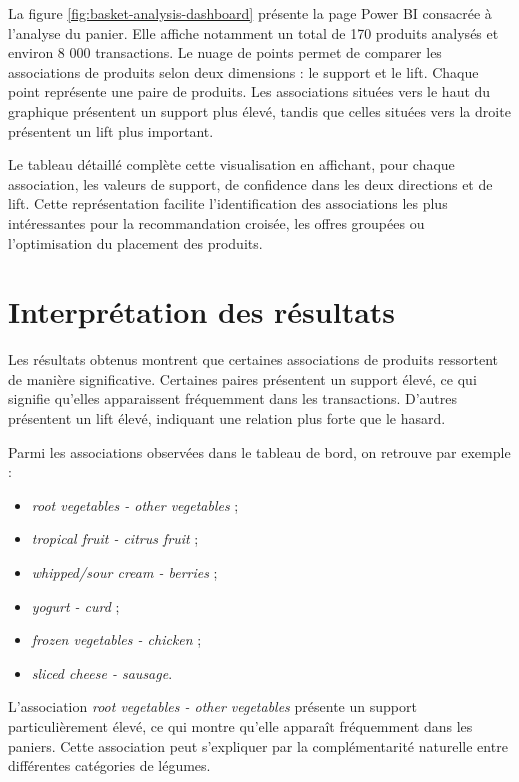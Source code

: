 \documentclass[12pt,a4paper,twoside]{report}
\begin{document}
La figure \ref{fig:basket-analysis-dashboard} présente la page Power BI consacrée à l'analyse du panier. Elle affiche notamment un total de 170 produits analysés et environ 8 000 transactions. Le nuage de points permet de comparer les associations de produits selon deux dimensions : le support et le lift. Chaque point représente une paire de produits. Les associations situées vers le haut du graphique présentent un support plus élevé, tandis que celles situées vers la droite présentent un lift plus important.

Le tableau détaillé complète cette visualisation en affichant, pour chaque association, les valeurs de support, de confidence dans les deux directions et de lift. Cette représentation facilite l'identification des associations les plus intéressantes pour la recommandation croisée, les offres groupées ou l'optimisation du placement des produits.

\section{Interprétation des résultats}

Les résultats obtenus montrent que certaines associations de produits ressortent de manière significative. Certaines paires présentent un support élevé, ce qui signifie qu'elles apparaissent fréquemment dans les transactions. D'autres présentent un lift élevé, indiquant une relation plus forte que le hasard.

Parmi les associations observées dans le tableau de bord, on retrouve par exemple :

\begin{itemize}
  \item \textit{root vegetables - other vegetables} ;
  \item \textit{tropical fruit - citrus fruit} ;
  \item \textit{whipped/sour cream - berries} ;
  \item \textit{yogurt - curd} ;
  \item \textit{frozen vegetables - chicken} ;
  \item \textit{sliced cheese - sausage}.
\end{itemize}

L'association \textit{root vegetables - other vegetables} présente un support particulièrement élevé, ce qui montre qu'elle apparaît fréquemment dans les paniers. Cette association peut s'expliquer par la complémentarité naturelle entre différentes catégories de légumes.
\end{document}
